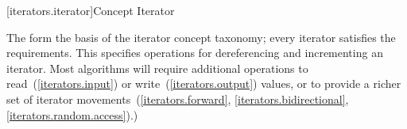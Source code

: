 
[iterators.iterator]{Concept Iterator}

\pnum
The   form
the basis of the iterator concept taxonomy; every iterator satisfies the
 requirements. This
 specifies operations for dereferencing and incrementing
an iterator. Most algorithms will require additional operations
 to
read~(\ref{iterators.input}) or write~(\ref{iterators.output}) values, or
to provide a richer set of iterator movements~(\ref{iterators.forward},
\ref{iterators.bidirectional}, \ref{iterators.random.access}).)


